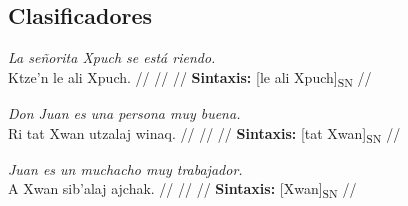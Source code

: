 \documentclass{article}%
\begin{document}
\subsection{Clasificadores}%
\label{subsec:Clasificadores}%

%
\par\medskip%
\ex
\textit{La señorita Xpuch se está riendo.} \\
\begingl
\gla Ktze’n le ali Xpuch. //
\glb  //
\glc  //
\glft \textbf{Sintaxis:} [le ali Xpuch]\textsubscript{SN} //
\endgl
\xe
%
\medskip%
\par\medskip%
\ex
\textit{Don Juan es una persona muy buena.} \\
\begingl
\gla Ri tat Xwan utzalaj winaq. //
\glb  //
\glc  //
\glft \textbf{Sintaxis:} [tat Xwan]\textsubscript{SN} //
\endgl
\xe
%
\medskip%
\par\medskip%
\ex
\textit{Juan es un muchacho muy trabajador.} \\
\begingl
\gla A Xwan sib’alaj ajchak. //
\glb  //
\glc  //
\glft \textbf{Sintaxis:} [Xwan]\textsubscript{SN} //
\endgl
\xe
%
\medskip

%
\end{document}
